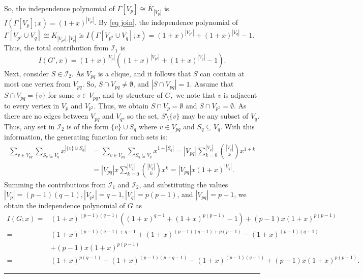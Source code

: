 \documentclass[12pt,twoside]{article}
\renewenvironment{proof}{{\noindent\bfseries Proof.}}{\qed}
\def\qed{\nolinebreak\hfill\rule{.2cm}{.2cm}\par\addvspace{.5cm}}
\begin{document}
\begin{proof}
	So, the independence polynomial of  $\varGamma[V_p]\cong \overline{K}_{|V_{p}|}$ is $I(\varGamma[V_p]; x) = (1+x)^{|V_p|}$. By \eqref{eq join}, the independence polynomial of 
	$\varGamma[V_{p^2} \cup V_q]\cong K_{|V_{p^2}|, |V_q|}$ is $I(\varGamma[V_{p^2} \cup V_q]; x) = (1+x)^{|V_{p^2}|} + (1+x)^{|V_q|} - 1$.
	Thus, the total contribution from $\mathcal{I}_1$ is $$I(G', x) = (1+x)^{|V_p|}\left((1+x)^{|V_{p^2}|} + (1+x)^{|V_q|} - 1\right).$$
	Next, consider $S \in \mathcal{I}_2$. As $V_{pq}$ is a clique, and it follows that $S$ can contain at most one vertex from $V_{pq}$. So, $S \cap V_{pq} \neq \emptyset$, and $|S \cap V_{pq}|=1$. Assume that  $S \cap V_{pq} = \{v\}$ for some $v \in V_{pq}$, and by structure of $G,$ we note that
	$v$ is adjacent to every vertex in $V_p$ and $V_{p^2}$. Thus, we obtain $S \cap V_p = \emptyset$ and $S \cap V_{p^2} = \emptyset$. As there are no edges between $V_{pq}$ and $V_q$, so the set, $S \setminus \{v\}$ may be any subset of $V_q$.
	Thus, any set in $\mathcal{I}_2$ is of the form $\{v\} \cup S_q$ where $v \in V_{pq}$ and $S_q \subseteq V_q$. With this information, the generating function for such sets is:
	\begin{align*}
		\sum_{v \in V_{pq}} \sum_{S_q \subseteq V_q} x^{|\{v\} \cup S_q|} &= \sum_{v \in V_{pq}} \sum_{S_q \subseteq V_q} x^{1+|S_q|} = |V_{pq}| \sum_{k=0}^{|V_q|} \binom{|V_q|}{k} x^{1+k} \\ 
		&= |V_{pq}|x \sum_{k=0}^{|V_q|} \binom{|V_q|}{k} x^k = |V_{pq}|x(1+x)^{|V_q|}.
	\end{align*}
	Summing the contributions from $\mathcal{I}_{1}$ and $\mathcal{I}_{2}$, and substituting the values $|V_p| = (p-1)(q-1), |V_{p^2}| = q-1,|V_q| = p(p-1)$, and $|V_{pq}| = p-1$, we obtain the independence polynomial of $G$ as
	\begin{align*}
		I(G; x) =& (1+x)^{(p-1)(q-1)}\left((1+x)^{q-1} + (1+x)^{p(p-1)} - 1\right) + (p-1)x(1+x)^{p(p-1)}\\
		=& (1+x)^{(p-1)(q-1)+q-1} + (1+x)^{(p-1)(q-1)+p(p-1)} - (1+x)^{(p-1)(q-1)}\\
		& + (p-1)x(1+x)^{p(p-1)}\\
		=& (1+x)^{p(q-1)} + (1+x)^{(p-1)(p+q-1)} - (1+x)^{(p-1)(q-1)} + (p-1)x(1+x)^{p(p-1)}.
	\end{align*}
\end{proof}
\end{document}
